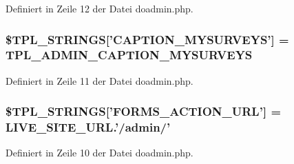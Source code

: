 Definiert in Zeile 12 der Datei doadmin.php.
\subsubsection{\setlength{\rightskip}{0pt plus 5cm}\$TPL\_\-STRINGS['CAPTION\_\-MYSURVEYS'] = {\bf TPL\_\-ADMIN\_\-CAPTION\_\-MYSURVEYS}}\label{doadmin_8php_0afbd0b277e574e9939eea9a136ef999}




Definiert in Zeile 11 der Datei doadmin.php.
\subsubsection{\setlength{\rightskip}{0pt plus 5cm}\$TPL\_\-STRINGS['FORMS\_\-ACTION\_\-URL'] = LIVE\_\-SITE\_\-URL.'/admin/'}\label{doadmin_8php_823c4b552b4a5b8af4c5197799581922}




Definiert in Zeile 10 der Datei doadmin.php.